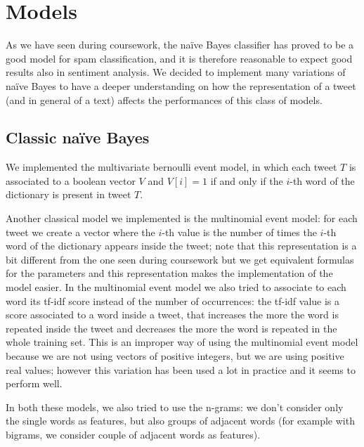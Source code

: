 \section*{Models}
As we have seen during coursework, the na\"ive Bayes classifier has proved to be a good model for spam classification, and it is therefore reasonable to expect good results also in sentiment analysis. We decided to implement many variations of na\"ive Bayes to have a deeper understanding on how the representation of a tweet (and in general of a text) affects the performances of this class of models.
\subsection*{Classic na\"ive Bayes}
We implemented the multivariate bernoulli event model, in which each tweet $T$ is associated to a boolean vector $V$ and $V[i]=1$ if and only if the $i$-th word of the dictionary is present in tweet $T$.

Another classical model we implemented is the multinomial event model: for each tweet we create a vector where the $i$-th value is the number of times the $i$-th word of the dictionary appears inside the tweet; note that this representation is a bit different from the one seen during coursework but we get equivalent formulas for the parameters and this representation makes the implementation of the model easier. In the multinomial event model we also tried to associate to each word its tf-idf score instead of the number of occurrences: the tf-idf value is a score associated to a word inside a tweet, that increases the more the word is repeated inside the tweet and decreases the more the word is repeated in the whole training set. This is an improper way of using the multinomial event model because we are not using vectors of positive integers, but we are using positive real values; however this variation has been used a lot in practice and it seems to perform well.

In both these models, we also tried to use the n-grams: we don't consider only the single words as features, but also groups of adjacent words (for example with bigrams, we consider couple of adjacent words as features).

